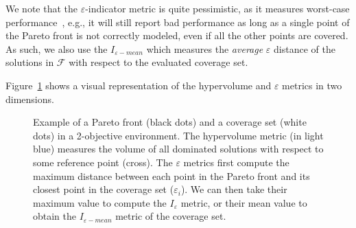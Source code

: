 \documentclass{article}
\renewcommand{\cite}[1]{\citep{#1}}
\begin{document}
We note that the $\varepsilon$-indicator metric is quite pessimistic, as it measures worst-case performance~\cite{zintgraf2015}, e.g., it will still report bad performance as long as a single point of the Pareto front is not correctly modeled, even if all the other points are covered. As such, we also use the $I_{\varepsilon-mean}$ \cite{reymond2022pcn} which measures the \emph{average} $\varepsilon$ distance of the solutions in $\mathcal{F}$ with respect to the evaluated coverage set.

Figure~\ref{fig:paretofrontmetrics} shows a visual representation of the hypervolume and $\varepsilon$ metrics in two dimensions.

\begin{figure}[t!]
    \centering
    \caption{Example of a Pareto front (black dots) and a coverage set (white dots) in a 2-objective environment. The hypervolume metric (in light blue) measures the volume of all dominated solutions with respect to some reference point (cross). The $\varepsilon$ metrics first compute the maximum distance between each point in the Pareto front and its closest point in the coverage set ($\varepsilon_i$). We can then take their maximum value to compute the $I_\varepsilon$ metric, or their mean value to obtain the $I_{\varepsilon-mean}$ metric of the coverage set.}
    \label{fig:paretofrontmetrics}
\end{figure}
\end{document}
